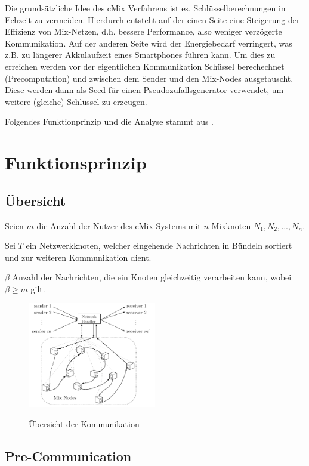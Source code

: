 \documentclass[
    fontsize=12pt,
    headings=small,
    parskip=half,           %
    bibliography=totoc,
    numbers=noenddot,       %
    open=any,               %
    ]{scrreprt}
\begin{document}
Die grundsätzliche Idee des cMix Verfahrens ist es, Schlüsselberechnungen in Echzeit zu vermeiden. Hierdurch entsteht auf 
der einen Seite eine Steigerung der Effizienz von Mix-Netzen, d.h. bessere Performance, also weniger verzögerte Kommunikation. Auf der anderen Seite wird
 der Energiebedarf verringert, was z.B. zu längerer Akkulaufzeit eines Smartphones führen kann.
 Um dies zu erreichen werden vor der eigentlichen Kommunikation Schüssel berechechnet (Precomputation) und zwischen dem Sender und den Mix-Nodes ausgetauscht.
 Diese werden dann als Seed für einen Pseudozufallsgenerator verwendet, um weitere (gleiche) Schlüssel zu erzeugen.
 
Folgendes Funktionprinzip und die Analyse stammt aus \cite{DBLP:journals/iacr/DavidChaumJKKRS16}.


\section{Funktionsprinzip}
\subsection{Übersicht}
Seien $m$ die Anzahl der Nutzer des cMix-Systems mit $n$ Mixknoten $N_1, N_2, ... ,  N_n$. 

Sei $T$ ein Netzwerkknoten, welcher eingehende Nachrichten in Bündeln sortiert und zur weiteren Kommunikation dient.

$\beta$ Anzahl der Nachrichten, die ein Knoten gleichzeitig verarbeiten kann, wobei $\beta \geq m$ gilt.

\begin{figure}[h]
 \caption{Übersicht der Kommunikation}
\includegraphics[width=0.5\textwidth]{Bilder/commu_model.png} \label{graphic:commu}
\end{figure}



\subsection{Pre-Communication}
\end{document}
